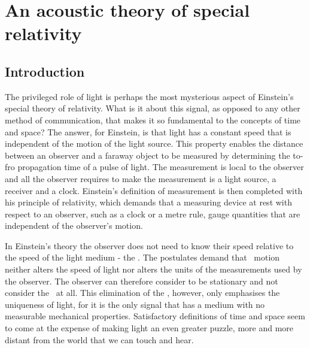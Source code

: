 

\chapter{An acoustic theory of special relativity}\label{ch:acousticSR}


\section{Introduction}\label{sec:AcousticSR:introduction}

The privileged role of light is perhaps the most mysterious aspect of Einstein's special theory of relativity.
What is it about this signal, as opposed to any other method of communication, that makes it  so fundamental to the  concepts of time and space?
The answer, for Einstein, is  that light has a constant speed that  is independent of the motion of the light source\cite{Einstein1905}.
This  property enables the  distance between an observer and a faraway object  to be measured  by determining the to-fro propagation time of a pulse of light.
The measurement is local to the observer and all the observer requires to make the measurement 
 is a light source, a receiver and a clock.
Einstein's definition of measurement is then completed with his principle of relativity,
which demands that a measuring device at rest with respect to an observer, such as a clock or a metre rule, 
gauge quantities that are independent of the observer's motion\cite{Einstein1905, Pierseaux2005}.

In Einstein's  theory the observer does  not need to know their speed relative to the speed of the light medium - the {\em \aether}.
The postulates demand that \aetherial\ motion  neither alters the speed of light
nor alters the units of the measurements used by the observer.
%
The observer can therefore consider \herself to be stationary and not consider the \aether\ at all.
This elimination of the \aether, however, only emphasises the uniqueness of light, for it is the  only  signal that has a  medium with no measurable mechanical properties.
Satisfactory definitions of time and space seem to come at the expense of making light  an even greater puzzle,
more and more distant from the world that we can touch and hear.

